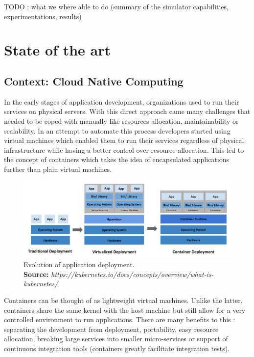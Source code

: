 \documentclass[12pt, a4paper]{memoir}
\newcommand*{\captionsource}[2]{%
    \caption[{#1}]{%
        #1%
        \\\hspace{\linewidth}%
	\textbf{Source:} \textit{#2}%
    }%
}
\begin{document}
TODO : what we where able to do (summary of the simulator capabilities,
experimentations, results)

\chapter{State of the art}

\section{Context: Cloud Native Computing}

In the early stages of application development, organizations used to run their
services on physical servers. With this direct approach came many challenges
that needed to be coped with manually like resources allocation,
maintainability or scalability. In an attempt to automate this process
developers started using virtual machines which enabled them to run their
services regardless of physical infrastructure while having a better control
over resource allocation.  This led to the concept of containers which takes
the idea of encapsulated applications further than plain virtual machines.

\begin{figure}[h]
	\centering
	\includegraphics[width=\textwidth]{./imgs/container_evolution.png}
	\captionsource{Evolution of application deployment.}{https://kubernetes.io/docs/concepts/overview/what-is-kubernetes/}
	\label{fig:container-evolution}
\end{figure}

Containers can be thought of as lightweight virtual machines. Unlike the
latter, containers share the same kernel with the host machine but still allow
for a very controlled environment to run applications. There are many
benefits to this : separating the development from deployment, portability,
easy resource allocation, breaking large services into smaller micro-services
or support of continuous integration tools (containers greatly facilitate
integration tests).\\
\end{document}
